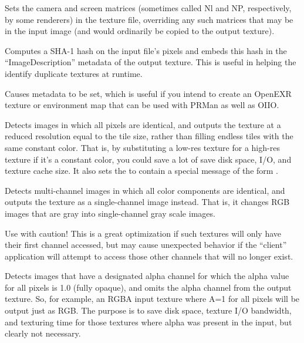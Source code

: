 
Sets the camera and screen matrices (sometimes called {\cf Nl} and
{\cf NP}, respectively, by some renderers) in the texture file, 
overriding any such matrices that may be in the input image (and would
ordinarily be copied to the output texture).
\apiend

Computes a SHA-1 hash on the input file's pixels and embeds this hash
in the ``ImageDescription'' metadata of the output texture.  This is
useful in helping the \TextureSystem identify duplicate textures at
runtime.
\apiend

Causes metadata  to be set, which is useful if
you intend to create an OpenEXR texture or environment map that can be
used with PRMan as well as OIIO.
\apiend

Detects images in which all pixels are identical, and outputs the
texture at a reduced resolution equal to the tile size, rather than
filling endless tiles with the same constant color.  That is, by
substituting a low-res texture for a high-res texture if it's a constant
color, you could save a lot of save disk space, I/O, and texture cache size.
It also sets the  to contain a
special message of the form .  
\apiend

Detects multi-channel images in which all color components are
identical, and outputs the texture as a single-channel image instead.
That is, it changes RGB images that are gray into single-channel gray
scale images.

Use with caution!  This is a great optimization if such textures will
only have their first channel accessed, but may cause unexpected behavior
if the ``client'' application will attempt to access those other
channels that will no longer exist.
\apiend

Detects images that have a designated alpha channel for which the alpha value
for all pixels is 1.0 (fully opaque), and omits the alpha channel from
the output texture.  So, for example, an RGBA input texture where A=1
for all pixels will be output just as RGB.  The purpose is to save disk
space, texture I/O bandwidth, and texturing time for those textures
where alpha was present in the input, but clearly not necessary.

